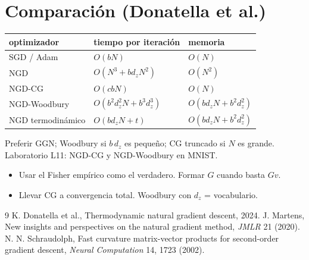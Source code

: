 \documentclass[11pt,a4paper]{article}
\begin{document}
\section{Comparación (Donatella et al.)}
\begin{center}\small\begin{tabular}{lll}\toprule
optimizador & tiempo por iteración & memoria\\\midrule
SGD / Adam & $O(bN)$ & $O(N)$\\
NGD & $O(N^3+bd_zN^2)$ & $O(N^2)$\\
NGD-CG & $O(cbN)$ & $O(N)$\\
NGD-Woodbury & $O(b^2d_z^2N+b^3d_z^3)$ & $O(bd_zN+b^2d_z^2)$\\
NGD termodinámico & $O(bd_zN+t)$ & $O(bd_zN+b^2d_z^2)$\\\bottomrule\end{tabular}\end{center}

\begin{aplicacion}
Preferir GGN; Woodbury si $b\,d_z$ es pequeño; CG truncado si $N$ es grande. Laboratorio L11: NGD-CG y NGD-Woodbury en MNIST.
\end{aplicacion}

\begin{error}
\begin{itemize}[nosep]
\item Usar el Fisher empírico como el verdadero. \quad Formar $G$ cuando basta $Gv$.
\item Llevar CG a convergencia total. \quad Woodbury con $d_z$ = vocabulario.
\end{itemize}
\end{error}

\begin{thebibliography}{9}\small
{} K. Donatella et al., Thermodynamic natural gradient descent, 2024.
 J. Martens, New insights and perspectives on the natural gradient method, \emph{JMLR} 21 (2020).
 N. N. Schraudolph, Fast curvature matrix-vector products for second-order gradient descent, \emph{Neural Computation} 14, 1723 (2002).
\end{thebibliography}
\end{document}
